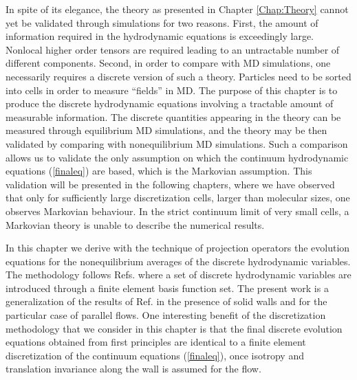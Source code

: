 \documentclass[b5paper,openright,10pt]{book}
\begin{document}
In   spite   of   its   elegance,   the   theory   as   presented   in
Chapter \ref{Chap:Theory}  cannot yet  be validated  through simulations
for two  reasons.  First,  the amount of  information required  in the
hydrodynamic equations  is exceedingly  large. Nonlocal  higher order
tensors are  required leading  to an  untractable number  of different
components.   Second, in  order to  compare with  MD simulations,  one
necessarily requires  a discrete version  of such a  theory. Particles
need to  be sorted into  cells in order  to measure ``fields''  in MD.
The  purpose  of  this chapter  is  to  produce  the  discrete
hydrodynamic  equations involving  a  tractable  amount of  measurable
information. The  discrete quantities appearing  in the theory  can be
measured through  equilibrium MD  simulations, and  the theory  may be
then validated by comparing with nonequilibrium MD simulations.  Such
a comparison  allows us to validate  the only assumption on  which the
continuum hydrodynamic equations (\ref{finaleq}) are
based, which  is the  Markovian assumption.   This validation  will be
presented in the following chapters, where  we have observed  that only
for  sufficiently large  discretization cells,  larger than  molecular
sizes,  one observes  Markovian  behaviour.  In  the strict  continuum
limit of  very small cells, a  Markovian theory is unable  to describe
the numerical  results.  

In  this chapter  we  derive  with  the technique  of  projection
operators the  evolution equations for the  nonequilibrium averages of
the discrete  hydrodynamic variables.   The methodology  follows Refs.
\cite{Espanol2009i,Espanol2009c,DelaTorre2015,EspanolDonev2015}  where
a  set of  discrete hydrodynamic  variables are  introduced through  a
finite  element   basis  function   set.   The   present  work   is  a
generalization of the results  of Ref.  \cite{EspanolDonev2015} in the
presence of solid walls and for the particular case of parallel flows.
One
interesting benefit of the discretization methodology that we consider
in this chapter is that  the final discrete evolution equations obtained
from first principles are identical to a finite element discretization
of the  continuum equations  (\ref{finaleq}),  once isotropy
and translation invariance along the wall is assumed for the flow.
\end{document}
